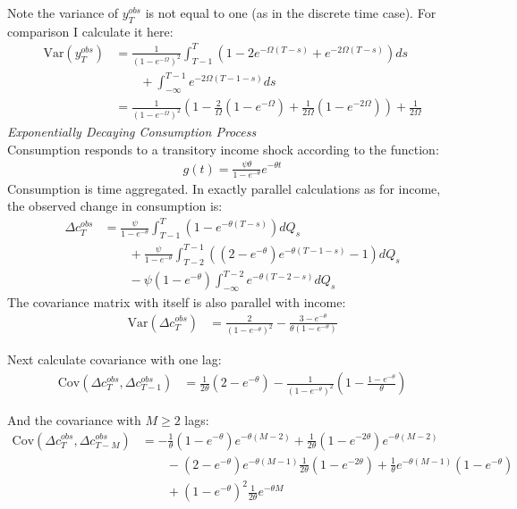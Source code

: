 \documentclass[12pt,pdftex,letterpaper]{article}
\begin{document}
Note the variance of $y_T^{obs}$ is not equal to one (as in the discrete time case). For comparison I calculate it here:
\begin{align*}
\mathrm{Var}( y_T^{obs}) &= \frac{1}{(1-e^{-\Omega})^2}\int_{T-1}^{T} ( 1 - 2e^{-\Omega (T-s)}  + e^{-2\Omega (T-s)}) ds \\
& \qquad +  \int_{-\infty}^{T-1}  e^{-2\Omega (T-1-s)} ds \\
&= \frac{1}{(1-e^{-\Omega})^2}\left( 1 - \frac{2}{\Omega}(1-e^{-\Omega})    + \frac{1}{2\Omega}(1-e^{-2\Omega}) \right) +  \frac{1}{2\Omega}
\end{align*}
\textit{Exponentially Decaying Consumption Process}\\
Consumption responds to a transitory income shock according to the function:
\begin{align*}
g(t) = \frac{\psi \theta}{1-e^{-\theta}} e^{-\theta t}
\end{align*}
Consumption is time aggregated. In exactly parallel calculations as for income, the observed change in consumption is:
\begin{align*}
\Delta c_T^{obs} 
&=\frac{\psi}{1-e^{-\theta}}\int_{T-1}^{T}  ( 1 - e^{-\theta (T-s)} ) dQ_s \\ 
& \qquad +  \frac{\psi}{1-e^{-\theta}} \int_{T-2}^{T-1}\left( (2-e^{-\theta}) e^{-\theta (T-1-s)} -1  \right)dQ_s \\
& \qquad - \psi (1-e^{-\theta}) \int_{-\infty}^{T-2}  e^{-\theta (T-2-s)} dQ_s 
\end{align*}
The covariance matrix with itself is also parallel with income:
\begin{align*}
\mathrm{Var}(\Delta c_T^{obs}) 
&=  \frac{2}{(1-e^{-\theta})^2}   - \frac{ 3 -e^{-\theta}}{\theta(1-e^{-\theta})}
\end{align*}


Next calculate covariance with one lag:
\begin{align*}
\mathrm{Cov}(\Delta c_T^{obs},\Delta c_{T-1}^{obs}) 
&=   \frac{1}{2\theta}(2-e^{-\theta}) - \frac{1}{(1-e^{-\theta})^2}( 1 - \frac{1-e^{-\theta}}{\theta})
\end{align*}

And the covariance with $M \geq 2$ lags: 
\begin{align*}
\mathrm{Cov}(\Delta c_T^{obs},\Delta c_{T-M}^{obs}) 
&= -\frac{1}{\theta}(1-e^{-\theta})e^{-\theta (M-2)} +\frac{1}{2\theta}(1-e^{-2\theta})e^{-\theta (M-2)} \\
& \qquad - (2-e^{-\theta}) e^{-\theta(M-1)}\frac{1}{2\theta}(1-e^{-2\theta}) + \frac{1}{\theta} e^{-\theta(M-1)} (1-e^{-\theta})\\
& \qquad +(1-e^{-\theta})^2 \frac{1}{2\theta} e^{-\theta M} \\
\end{align*}


\end{document}
